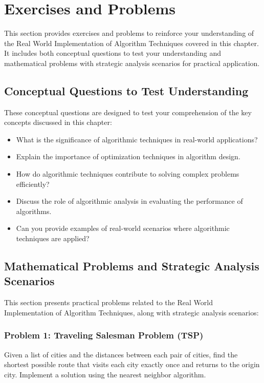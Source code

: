 \documentclass[12pt]{book} %
\begin{document}
\section{Exercises and Problems}

This section provides exercises and problems to reinforce your understanding of the Real World Implementation of Algorithm Techniques covered in this chapter. It includes both conceptual questions to test your understanding and mathematical problems with strategic analysis scenarios for practical application.

\subsection{Conceptual Questions to Test Understanding}

These conceptual questions are designed to test your comprehension of the key concepts discussed in this chapter:

\begin{itemize}
    \item What is the significance of algorithmic techniques in real-world applications?
    \item Explain the importance of optimization techniques in algorithm design.
    \item How do algorithmic techniques contribute to solving complex problems efficiently?
    \item Discuss the role of algorithmic analysis in evaluating the performance of algorithms.
    \item Can you provide examples of real-world scenarios where algorithmic techniques are applied?
\end{itemize}

\subsection{Mathematical Problems and Strategic Analysis Scenarios}

This section presents practical problems related to the Real World Implementation of Algorithm Techniques, along with strategic analysis scenarios:

\subsubsection*{Problem 1: Traveling Salesman Problem (TSP)}

Given a list of cities and the distances between each pair of cities, find the shortest possible route that visits each city exactly once and returns to the origin city. Implement a solution using the nearest neighbor algorithm.
\end{document}
